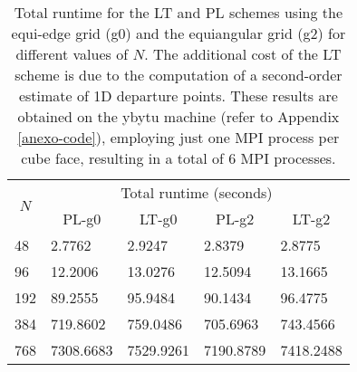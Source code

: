 \begin{table}[!h]
	\begin{tabular}{|l|llll|}
		\hline
		\multicolumn{1}{|c|}{\multirow{2}{*}{\textbf{$N$}}} & \multicolumn{4}{c|}{Total runtime (seconds)}                                                                              \\ \cline{2-5} 
		\multicolumn{1}{|c|}{}                              & \multicolumn{1}{c|}{PL-g0}     & \multicolumn{1}{c|}{LT-g0}     & \multicolumn{1}{c|}{PL-g2}     & \multicolumn{1}{c|}{LT-g2} \\ \hline
		48                                                  & \multicolumn{1}{l|}{2.7762}    & \multicolumn{1}{l|}{2.9247}    & \multicolumn{1}{l|}{2.8379 }    & 2.8775                     \\ \hline
		96                                                  & \multicolumn{1}{l|}{12.2006}   & \multicolumn{1}{l|}{13.0276}   & \multicolumn{1}{l|}{12.5094}   & 13.1665                     \\ \hline
		192                                                 & \multicolumn{1}{l|}{89.2555}   & \multicolumn{1}{l|}{95.9484}   & \multicolumn{1}{l|}{90.1434}   & 96.4775                    \\ \hline
		384                                                 & \multicolumn{1}{l|}{719.8602}  & \multicolumn{1}{l|}{759.0486}  & \multicolumn{1}{l|}{705.6963}  & 743.4566                   \\ \hline
		768                                                 & \multicolumn{1}{l|}{7308.6683} & \multicolumn{1}{l|}{7529.9261} & \multicolumn{1}{l|}{7190.8789} & 7418.2488                  \\ \hline
	\end{tabular}
	\caption{Total runtime for the LT and PL schemes using the equi-edge grid (g0) and the equiangular grid (g2) for different values of $N$.
		The additional cost of the LT scheme is due to the computation of a second-order estimate of 1D departure points.
	These results are obtained on the ybytu machine (refer to Appendix \ref{anexo-code}), 
	employing just one MPI process per cube face, resulting in a total of 6 MPI processes.}
\label{sw-time}
\end{table}


\newpage
